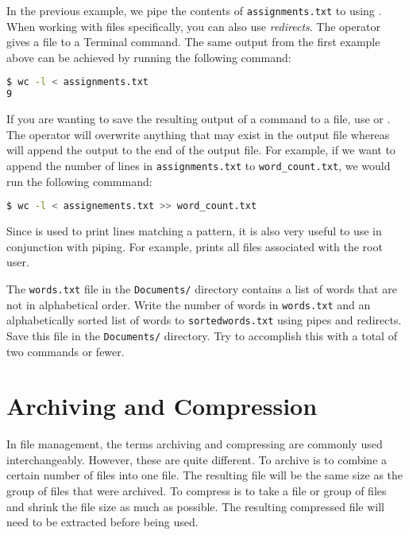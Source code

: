 In the previous example, we pipe the contents of \texttt{assignments.txt} to  using .
When working with files specifically, you can also use \emph{redirects}.
The \li{<} operator gives a file to a Terminal command.
The same output from the first example above can be achieved by running the following command:

\begin{lstlisting}[language=bash]
$ wc -l < assignments.txt
9
\end{lstlisting}

If you are wanting to save the resulting output of a command to a file, use \li{>} or \li{>>}.
The \li{>} operator will overwrite anything that may exist in the output file whereas \li{>>} will append the output to the end of the output file.
For example, if we want to append the number of lines in \texttt{assignments.txt} to \texttt{word\_count.txt}, we would run the following commmand:

\begin{lstlisting}[language=bash]
$ wc -l < assignements.txt >> word_count.txt
\end{lstlisting}

Since  is used to print lines matching a pattern, it is also very useful to use in conjunction with piping.
For example,  prints all files associated with the root user.

\begin{problem}
The \texttt{words.txt} file in the \texttt{Documents/} directory contains a list of words that are not in alphabetical order.
Write the number of words in \texttt{words.txt} and an alphabetically sorted list of words to \texttt{sortedwords.txt} using pipes and redirects.
Save this file in the \texttt{Documents/} directory.
Try to accomplish this with a total of two commands or fewer.
\end{problem}

\section*{Archiving and Compression}
In file management, the terms archiving and compressing are commonly used interchangeably.
However, these are quite different.
To archive is to combine a certain number of files into one file.
The resulting file will be the same size as the group of files that were archived.
To compress is to take a file or group of files and shrink the file size as much as possible.
The resulting compressed file will need to be extracted before being used.

